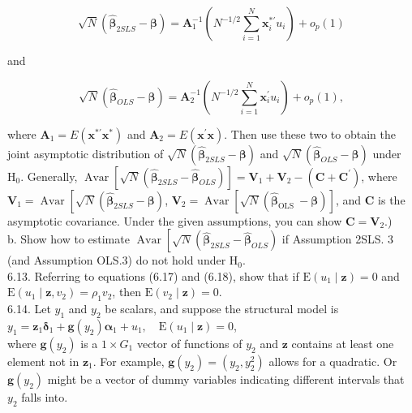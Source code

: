 \documentclass[10pt]{article}
\begin{document}
$$
\sqrt{N}\left(\hat{\boldsymbol{\beta}}_{2 S L S}-\boldsymbol{\beta}\right)=\mathbf{A}_{1}^{-1}\left(N^{-1 / 2} \sum_{i=1}^{N} \mathbf{x}_{i}^{* \prime} u_{i}\right)+o_{p}(1)
$$

and

$$
\sqrt{N}\left(\hat{\boldsymbol{\beta}}_{O L S}-\boldsymbol{\beta}\right)=\mathbf{A}_{2}^{-1}\left(N^{-1 / 2} \sum_{i=1}^{N} \mathbf{x}_{i}^{\prime} u_{i}\right)+o_{p}(1),
$$

where $\mathbf{A}_{1}=E\left(\mathbf{x}^{* \prime} \mathbf{x}^{*}\right)$ and $\mathbf{A}_{2}=E\left(\mathbf{x}^{\prime} \mathbf{x}\right)$. Then use these two to obtain the joint asymptotic distribution of $\sqrt{N}\left(\hat{\boldsymbol{\beta}}_{2 S L S}-\boldsymbol{\beta}\right)$ and $\sqrt{N}\left(\hat{\boldsymbol{\beta}}_{O L S}-\boldsymbol{\beta}\right)$ under $\mathrm{H}_{0}$. Generally, $\operatorname{Avar}\left[\sqrt{N}\left(\hat{\boldsymbol{\beta}}_{2 S L S}-\hat{\boldsymbol{\beta}}_{O L S}\right)\right]=\mathbf{V}_{1}+\mathbf{V}_{2}-\left(\mathbf{C}+\mathbf{C}^{\prime}\right)$, where $\mathbf{V}_{1}=\operatorname{Avar}\left[\sqrt{N}\left(\hat{\boldsymbol{\beta}}_{2 S L S}-\boldsymbol{\beta}\right)\right.$, $\mathbf{V}_{2}=\operatorname{Avar}\left[\sqrt{N}\left(\hat{\boldsymbol{\beta}}_{\text {OLS }}-\boldsymbol{\beta}\right)\right]$, and $\mathbf{C}$ is the asymptotic covariance. Under the given assumptions, you can show $\mathbf{C}=\mathbf{V}_{2}$.)\\
b. Show how to estimate $\operatorname{Avar}\left[\sqrt{N}\left(\hat{\boldsymbol{\beta}}_{2 S L S}-\hat{\boldsymbol{\beta}}_{O L S}\right)\right.$ if Assumption 2SLS. 3 (and Assumption OLS.3) do not hold under $\mathrm{H}_{0}$.\\
6.13. Referring to equations (6.17) and (6.18), show that if $\mathrm{E}\left(u_{1} \mid \mathbf{z}\right)=0$ and $\mathrm{E}\left(u_{1} \mid \mathbf{z}, v_{2}\right)=\rho_{1} v_{2}$, then $\mathrm{E}\left(v_{2} \mid \mathbf{z}\right)=0$.\\
6.14. Let $y_{1}$ and $y_{2}$ be scalars, and suppose the structural model is\\
$y_{1}=\mathbf{z}_{1} \boldsymbol{\delta}_{1}+\mathbf{g}\left(y_{2}\right) \boldsymbol{\alpha}_{1}+u_{1}, \quad \mathrm{E}\left(u_{1} \mid \mathbf{z}\right)=0$,\\
where $\mathbf{g}\left(y_{2}\right)$ is a $1 \times G_{1}$ vector of functions of $y_{2}$ and $\mathbf{z}$ contains at least one element not in $\mathbf{z}_{1}$. For example, $\mathbf{g}\left(y_{2}\right)=\left(y_{2}, y_{2}^{2}\right)$ allows for a quadratic. Or $\mathbf{g}\left(y_{2}\right)$ might be a vector of dummy variables indicating different intervals that $y_{2}$ falls into.
\end{document}
